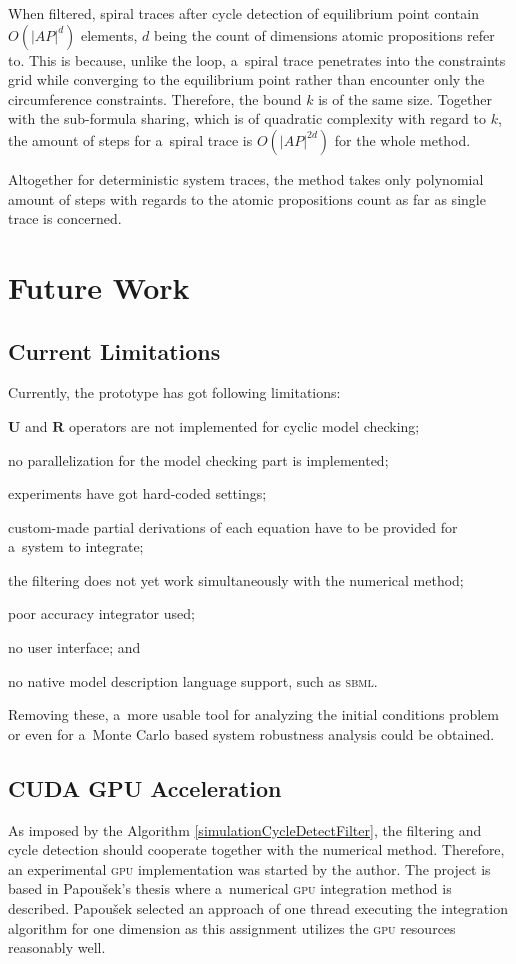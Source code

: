 \documentclass[12pt,twoside,draft]{fithesis}
\newcommand{\bU}{\mathbf{U}}
\newcommand{\bR}{\mathbf{R}}
\begin{document}
When filtered, spiral traces after cycle detection of equilibrium point
contain $O(|AP|^d)$ elements, $d$ being the count of dimensions atomic
propositions refer to. This is because, unlike the loop, a~spiral trace
penetrates into the constraints grid while converging to the equilibrium
point rather than encounter only the circumference constraints.
Therefore, the bound $k$ is of the same size. Together with the
sub-formula sharing, which is of quadratic complexity with regard to $k$,
the amount of steps for a~spiral trace is $O(|AP|^{2d})$ for the whole
method.

Altogether for deterministic system traces, the method takes only
polynomial amount of steps with regards to the atomic propositions
count as far as single trace is concerned.

\chapter{Future Work}
\section{Current Limitations}
Currently, the prototype has got following limitations:
\begin{inparaenum}
\item $\bU$ and $\bR$ operators are not implemented for cyclic model
	checking;
\item no parallelization for the model checking part is implemented;
\item experiments have got hard-coded settings;
\item custom-made partial derivations of each equation have to be
	provided for a~system to integrate;
\item the filtering does not yet work simultaneously with the numerical
	method;
\item poor accuracy integrator used;
\item no user interface; and
\item no native model description language support, such as
	\textsc{sbml}\cite{sbml}.
\end{inparaenum}

Removing these, a~more usable tool for analyzing the initial conditions
problem\cite{sven} or even for a~Monte Carlo based system robustness
analysis\cite{rizk} could be obtained.

\section{CUDA GPU Acceleration}
As imposed by the Algorithm \ref{simulationCycleDetectFilter}, the
filtering and cycle detection should cooperate together with the
numerical method. Therefore, an experimental \textsc{gpu} implementation
was started by the author\cite{me:cuda}. The project is based in
Papou\v{s}ek's thesis\cite{papousek} where a~numerical \textsc{gpu}
integration method is described. Papou\v{s}ek selected an approach of
one thread executing the integration algorithm for one dimension as this
assignment utilizes the \textsc{gpu} resources reasonably
well\cite{papousek}.
\end{document}
